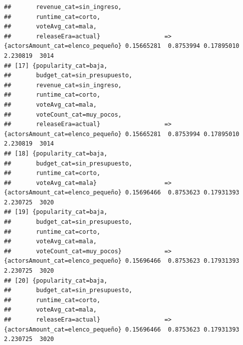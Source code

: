 \documentclass[
]{article}
\begin{document}
\begin{verbatim}
##       revenue_cat=sin_ingreso,                                                                                                
##       runtime_cat=corto,                                                                                                      
##       voteAvg_cat=mala,                                                                                                       
##       releaseEra=actual}                  => {actorsAmount_cat=elenco_pequeño} 0.15665281  0.8753994 0.17895010 2.230819  3014
## [17] {popularity_cat=baja,                                                                                                    
##       budget_cat=sin_presupuesto,                                                                                             
##       revenue_cat=sin_ingreso,                                                                                                
##       runtime_cat=corto,                                                                                                      
##       voteAvg_cat=mala,                                                                                                       
##       voteCount_cat=muy_pocos,                                                                                                
##       releaseEra=actual}                  => {actorsAmount_cat=elenco_pequeño} 0.15665281  0.8753994 0.17895010 2.230819  3014
## [18] {popularity_cat=baja,                                                                                                    
##       budget_cat=sin_presupuesto,                                                                                             
##       runtime_cat=corto,                                                                                                      
##       voteAvg_cat=mala}                   => {actorsAmount_cat=elenco_pequeño} 0.15696466  0.8753623 0.17931393 2.230725  3020
## [19] {popularity_cat=baja,                                                                                                    
##       budget_cat=sin_presupuesto,                                                                                             
##       runtime_cat=corto,                                                                                                      
##       voteAvg_cat=mala,                                                                                                       
##       voteCount_cat=muy_pocos}            => {actorsAmount_cat=elenco_pequeño} 0.15696466  0.8753623 0.17931393 2.230725  3020
## [20] {popularity_cat=baja,                                                                                                    
##       budget_cat=sin_presupuesto,                                                                                             
##       runtime_cat=corto,                                                                                                      
##       voteAvg_cat=mala,                                                                                                       
##       releaseEra=actual}                  => {actorsAmount_cat=elenco_pequeño} 0.15696466  0.8753623 0.17931393 2.230725  3020
\end{verbatim}
\end{document}
